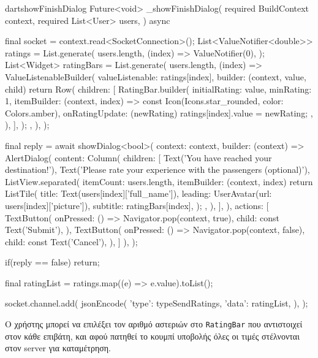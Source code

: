 \documentclass[../thesis.tex]{subfiles}
\begin{document}
\begin{codeblock}{dart}{showFinishDialog}
  Future<void> _showFinishDialog({
    required BuildContext context,
    required List<User> users,
  }) async {
    final socket = context.read<SocketConnection>();
    List<ValueNotifier<double>> ratings = List.generate(
      users.length,
      (index) => ValueNotifier(0),
    );
    List<Widget> ratingBars = List.generate(
      users.length,
      (index) => ValueListenableBuilder(
        valueListenable: ratings[index],
        builder: (context, value, child) {
          return Row(
            children: [
              RatingBar.builder(
                initialRating: value,
                minRating: 1,
                itemBuilder: (context, index) =>
                    const Icon(Icons.star_rounded, color: Colors.amber),
                onRatingUpdate: (newRating) {
                  ratings[index].value = newRating;
                },
              ),
            ],
          );
        },
      ),
    );

    final reply = await showDialog<bool>(
      context: context,
      builder: (context) => AlertDialog(
        content: Column(
          children: [
            Text('You have reached your destination!'),
            Text('Please rate your experience with the passengers (optional)'),
            ListView.separated(
              itemCount: users.length,
              itemBuilder: (context, index) {
                return ListTile(
                  title: Text(users[index]['full_name']),
                  leading: UserAvatar(url: users[index]['picture']),
                  subtitle: ratingBars[index],
                );
              },
            ),
          ],
        ),
        actions: [
          TextButton(
            onPressed: () => Navigator.pop(context, true),
            child: const Text('Submit'),
          ),
          TextButton(
            onPressed: () => Navigator.pop(context, false),
            child: const Text('Cancel'),
          ),
        ]
      ),
    );

    if(reply == false) return;

    final ratingList = ratings.map((e) => e.value).toList();

    socket.channel.add(
      jsonEncode({
        'type': typeSendRatings,
        'data': ratingList,
      }),
    );
  }
\end{codeblock}

Ο χρήστης μπορεί να επιλέξει τον αριθμό αστεριών στο \verb|RatingBar| που αντιστοιχεί στον κάθε επιβάτη, και αφού πατηθεί το κουμπί υποβολής όλες οι τιμές στέλνονται στον server για καταμέτρηση.
\end{document}
